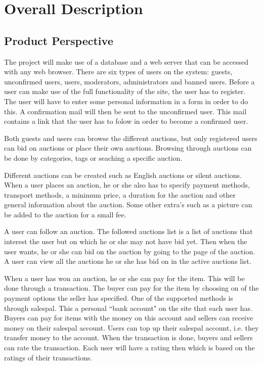 \chapter{Overall Description}

\section{Product Perspective}

	The project will make use of a database and a web server that can be 
	accessed with any web browser. There are six types of users on the system:
	guests, unconfirmed users, users, moderators, administrators and banned users. 
	Before a user can make use of the full functionality of the site, the user has to register. The user
	will have to enter some personal information in a form in order to do this. A confirmation mail will then be sent to the unconfirmed user. This mail contains a link that the user has to folow in order to become a confirmed user.
	
	Both guests and users can browse the different auctions, but only registered 
	users can bid on auctions or place their own auctions. Browsing through auctions can be done by categories, tags or seaching a specific auction. 
	
	Different auctions can be created such as English auctions\cite{English} or
	silent auctions\cite{silent}. When a user places an auction, he or she also has to specify
	payment methods, transport methods, a minimum price, a duration for the auction
	and other general information about the auction. Some other extra's such as a picture can be added to the auction for a small fee.
	
	A user can follow an auction. The followed auctions list is a list of auctions that interest the user
	but on which he or she may not have bid yet. Then when the user wants, he or she can bid on the auction
	by going to the page of the auction.
	A user can view all the auctions he or she has bid on in the active auctions list.
	
	When a user has won an auction, he or she can pay for the item. This will be done through a 
	transaction. The buyer can pay for the item by choosing on of the payment options the seller 
	has specified. One of the supported methods is through salespal. This a personal ``bank account" on
	the site that each user has. Buyers can pay for items with the money on this account and 
	sellers can receive money on their salespal account. Users can top up their salespal account,
	i.e. they transfer money to the account. When the transaction is done, buyers and sellers 
	can rate the transaction. Each user will have a rating then which is based on the ratings
	of their transactions. 
	

